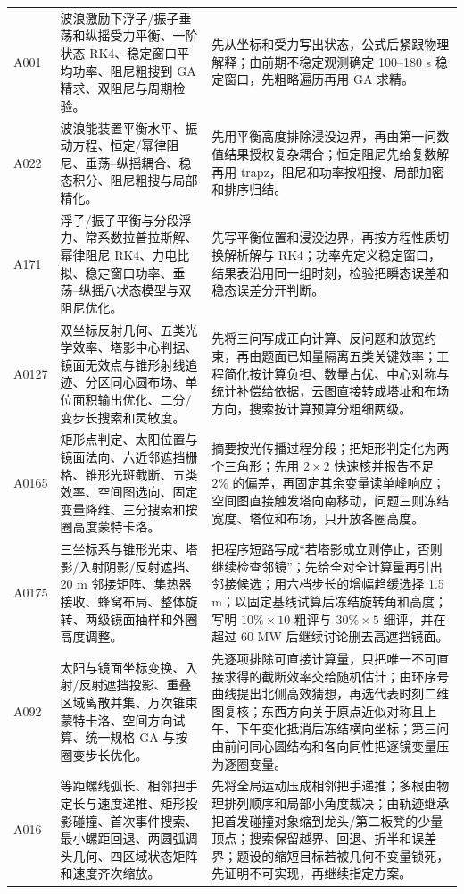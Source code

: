 \begin{longtable}{p{1.4cm}p{5.2cm}p{7.0cm}}
A001 & 波浪激励下浮子/振子垂荡和纵摇受力平衡、一阶状态 RK4、稳定窗口平均功率、阻尼粗搜到 GA 精求、双阻尼与周期检验。 &
先从坐标和受力写出状态，公式后紧跟物理解释；由前期不稳定观测确定 100--180 s 稳定窗口，先粗略遍历再用 GA 求精。\\
A022 & 波浪能装置平衡水平、振动方程、恒定/幂律阻尼、垂荡--纵摇耦合、稳态积分、阻尼粗搜与局部精化。 &
先用平衡高度排除浸没边界，再由第一问数值结果授权复杂耦合；恒定阻尼先给复数解再用 trapz，阻尼和功率按粗搜、局部加密和排序归结。\\
A171 & 浮子/振子平衡与分段浮力、常系数拉普拉斯解、幂律阻尼 RK4、力电比拟、稳定窗口功率、垂荡--纵摇八状态模型与双阻尼优化。 &
先写平衡位置和浸没边界，再按方程性质切换解析解与 RK4；功率先定义稳定窗口，结果表沿用同一组时刻，检验把瞬态误差和稳态误差分开判断。\\
A0127 & 双坐标反射几何、五类光学效率、塔影中心判据、镜面无效点与锥形射线追迹、分区同心圆布场、单位面积输出优化、二分/变步长搜索和灵敏度。 &
先将三问写成正向计算、反问题和放宽约束，再由题面已知量隔离五类关键效率；工程简化按计算负担、数量占优、中心对称与统计补偿给依据，云图直接转成塔址和布场方向，搜索按计算预算分粗细两级。\\
A0165 & 矩形点判定、太阳位置与镜面法向、六近邻遮挡栅格、锥形光斑截断、五类效率、空间图选向、固定变量降维、三分搜索和按圈高度蒙特卡洛。 &
摘要按光传播过程分段；把矩形判定化为两个三角形；先用 $2\times2$ 快速核并报告不足 $2\%$ 的偏差，再固定其余变量读单峰响应；空间图直接触发塔向南移动，问题三则冻结宽度、塔位和布场，只开放各圈高度。\\
A0175 & 三坐标系与锥形光束、塔影/入射阴影/反射遮挡、20 m 邻接矩阵、集热器接收、蜂窝布局、整体旋转、两级镜面抽样和外圈高度调整。 &
把程序短路写成“若塔影成立则停止，否则继续检查邻镜”；先给全对全计算量再引出邻接候选；用六档步长的增幅趋缓选择 1.5 m；以固定基线试算后冻结旋转角和高度；写明 $10\%\times10$ 粗评与 $30\%\times5$ 细评，并在超过 60 MW 后继续讨论删去高遮挡镜面。\\
A092 & 太阳与镜面坐标变换、入射/反射遮挡投影、重叠区域离散并集、万次锥束蒙特卡洛、空间方向试算、统一规格 GA 与按圈变步长优化。 &
先逐项排除可直接计算量，只把唯一不可直接求得的截断效率交给随机估计；由环序号曲线提出北侧高效猜想，再选代表时刻二维图复核；东西方向关于原点近似对称且上午、下午变化抵消后冻结横向坐标；第三问由前问同心圆结构和各向同性把逐镜变量压为逐圈变量。\\
A016 & 等距螺线弧长、相邻把手定长与速度递推、矩形投影碰撞、首次事件搜索、最小螺距回退、两圆弧调头几何、四区域状态矩阵和速度齐次缩放。 &
先将全局运动压成相邻把手递推；多根由物理排列顺序和局部小角度裁决；由轨迹继承把首发碰撞对象缩到龙头/第二板凳的少量顶点；搜索保留越界、回退、折半和误差界；题设的缩短目标若被几何不变量锁死，先证明不可实现，再继续指定方案。\\

\end{longtable}
